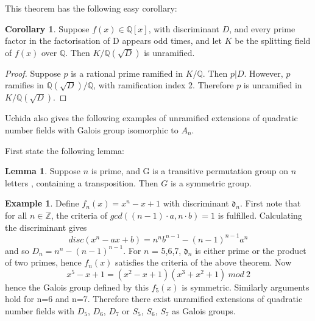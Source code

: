 \documentclass[12pt]{extarticle}
\newcommand{\Q}{\mathbb{Q}}
\newcommand{\Z}{\mathbb{Z}}
\newcommand{\<}{\langle}
\renewcommand{\>}{\rangle}
\theoremstyle{definition}
\newtheorem{corollary}{Corollary}
\newtheorem*{example}{Example}
\newtheorem{lemma}{Lemma}
\begin{document}
This theorem has the following easy corollary:
\begin{corollary}
Suppose $f(x) \in \Q[x]$, with discriminant $D$, and every prime factor in the factorisation of D appears odd times, and let $K$ be the splitting field of $f(x)$ over $\Q$. Then $K/\Q\left(\sqrt{D}\right)$ is unramified.
\end{corollary}
\begin{proof}
Suppose $p$ is a rational prime ramified in $K/\Q$. Then $p|D$. However, $p$ ramifies in $\Q(\sqrt{D})/\Q$, with ramification index 2. Therefore $p$ is unramified in $K/\Q(\sqrt{D})$. 
\end{proof}
Uchida also gives the following examples of unramified extensions of quadratic number fields with Galois group isomorphic to $A_n$.\par
First state the following lemma: 
\begin{lemma}
Suppose $n$ is prime, and G is a transitive permutation group on $n$ letters , containing a transposition. Then $G$ is a symmetric group.
\end{lemma}

\begin{example}
Define $f_n(x) = x^n-x+1$ with discriminant $\mathfrak{d}_n$. First note that for all $n \in \Z$, the criteria of $gcd((n-1)\cdot a, n \cdot b) =1 $ is fulfilled. Calculating the discriminant gives
\begin{equation}
disc(x^n-ax+b) = n^nb^{n-1}-(n-1)^{n-1}a^n
\end{equation} and so $D_n = n^n-(n-1)^{n-1}$. For $n$ = 5,6,7, $\mathfrak{d}_n$ is either prime or the product of two primes, hence $f_n(x)$ satisfies the criteria of the above theorem.  Now 
\begin{equation}
x^5 - x+1 = (x^2 - x +1)(x^3 +x^2 +1)\:mod\:2
\end{equation}
hence the Galois group defined by this $f_5(x)$ is symmetric. Similarly arguments hold for n=6 and n=7. Therefore there exist unramified extensions of quadratic number fields with $D_5$, $D_6$, $D_7$ or $S_5$, $S_6$, $S_7$ as Galois groups. 
\end{example}
\end{document}
